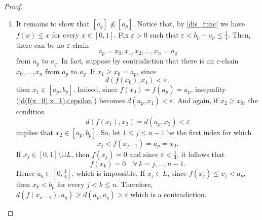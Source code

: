 \documentclass[pdflatex,sn-mathphys-num]{sn-jnl}
\theoremstyle{thmstyleone}%
\theoremstyle{thmstyletwo}%
\theoremstyle{thmstylethree}%
\begin{document}
\begin{proof}
\begin{enumerate}
Fix $\varepsilon>0$.
If $\varepsilon> a_q-b_p$ then the three points $a_q, b_p, a_p$ form an $\varepsilon$-chain from $a_q$ to $a_p$.
Indeed, $d(f(a_q),b_p)=d(a_q,b_p)<\varepsilon$ and $f(b_p)=a_p$.
So suppose that $\varepsilon<a_q-b_p$. 
By \eqref{eq_mis_compl} and since $(L,<_\mathcal{P})$ is densely ordered, there is $n$ sufficiently large that we can choose $n-2$ intervals 
\[
J_{n-2}<_\mathcal{P} J_{n-1}<_\mathcal{P}\cdots <_\mathcal{P} J_1
\]
in $L$ with $J_1=[x_1,y_1]$, $J_2=[x_2,y_2]$, $\ldots$, $J_{n-2}=[x_{n-2},y_{n-2}]$, such that
\begin{align*}
    &d(a_q,y_1)<\varepsilon\\
    &d(x_1,y_2)<\varepsilon\\
    &\quad\quad\vdots\\
    &d(x_{n-3},y_{n-2})<\varepsilon\\
    &d(x_{n-2},b_p)<\varepsilon
\end{align*}
From the definition of $f$ given by \eqref{dis_func}, we have that $f(a_q)=a_q$ and $f(y_i)=x_i$ for every $i=1,\ldots,n-2$. Therefore, we can rewrite the previous inequalities as
\begin{align*}
    &d(f(a_q),y_1)<\varepsilon\\
    &d(f(y_1),y_2)<\varepsilon\\
    &\quad\qquad\vdots\\
    &d(f(y_{n-3}),y_{n-2})<\varepsilon\\
    &d(f(y_{n-2}),b_p)<\varepsilon
\end{align*}
Since $f(b_p)=a_p$, it follows that the points
$$
a_q,y_1,y_2,\ldots,y_{n-2},b_p, a_p
$$
form an $\varepsilon$-chain from $a_q$ to $a_p$. 
We conclude that $[a_p]\preceq [a_q]$.

\item It remains to show that $[a_q]\not\preceq [a_p]$.
Notice that, by \eqref{dis_func} we have $f(x)\le x$ for every $x\in [0,1]$.
Fix $\varepsilon>0$ such that $\varepsilon< b_p-a_p\leq\frac{1}{4}$.
Then, there can be no $\varepsilon$-chain 
\[
a_p=x_0,x_1,x_2,\ldots,x_n=a_q
\]
from $a_p$ to $a_q$.
In fact, suppose by contradiction that there is an $\varepsilon$-chain  $x_0,\ldots,x_n$ from $a_p$ to $a_q$. If $x_1\ge x_0=a_p$, since 
\begin{equation}\label{d(f(x_0),x_1)<epsilon}
d(f(x_0),x_1)<\varepsilon,
\end{equation}
then $x_1\in [a_p,b_p]$. Indeed, since $f(x_0)=f(a_p)=a_p$, inequality (\ref{d(f(x_0),x_1)<epsilon}) becomes $d(a_p,x_1)<\varepsilon$.
And again, if $x_2\ge x_0$, the condition 
$$
d(f(x_1),x_2)=d(a_p,x_2)<\varepsilon
$$
implies that $x_2\in [a_p,b_p]$.
So, let $1\le j\le n-1$ be the first index for which 
$$
x_j< f(x_{j-1})=a_p=x_0.
$$
If $x_j\in [0,1]\setminus \cup L$, then $f(x_j)=0$ and since $\varepsilon<\frac 1 4$, it follows that 
$$
f(x_{k})=0 \quad \forall\, k=j,\ldots,n-1.
$$ 
Hence $a_q\in[0,\frac 1 4]$, which is impossible.
If $x_j\in L$, since $f(x_j)\le  x_j< a_p$, then $x_k < b_p$ for every $j<k\le n$. Therefore, $d(f(x_{n-1}),a_q)\ge d(a_p,a_q)>\varepsilon$ which is a contradiction.
\end{enumerate}


\end{proof}
\end{document}
